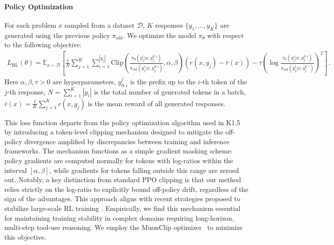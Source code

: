 \paragraph{Policy Optimization}
For each problem $x$ sampled from a dataset $\mathcal{D}$, $K$ responses $\{y_1,\dots,y_K\}$ are generated using the previous policy $\pi_{\mathrm{old}}$.
We optimize the model $\pi_\theta$ with respect to the following objective: 
\begin{align}
L_{\mathrm{RL}}(\theta) = \mathbb{E}_{x \sim\mathcal{D}}
\left[ \frac{1}{N} \sum_{j=1}^K \sum_{i=1}^{|y_j|}
\mathrm{Clip}
\left(
\frac{\pi_{\theta}(y_j^i | x, y_j^{0:i})}{\pi_{\mathrm{old}}(y_j^i | x, y_j^{0:i}) }, \alpha, \beta
\right)
({r}(x, y_j) - \bar{r}(x))- \tau \left( \log \frac{\pi_{\theta}(y_j^i | x, y_j^{0:i})}{\pi_{\mathrm{old}}(y_j^i | x, y_j^{0:i}) } \right)^2
\right]
\, .
\label{eq:rl-objective}
\end{align}
Here $\alpha, \beta, \tau >0$ are hyperparameters, 
$y^j_{0:i}$ is the prefix up to the $i$-th token of the $j$-th response, 
$N=\sum_{i=1}^{K} |y_i|$ is the total number of generated tokens in a batch, 
$\bar{r}(x) = \frac{1}{K}\sum_{j=1}^K r(x, y_j)$ is the mean reward of all generated responses.   

This loss function departs from the policy optimization algorithm used in K1.5~\citep{team2025kimi} by introducing a token-level clipping mechanism designed to mitigate the off-policy divergence amplified by discrepancies between training and inference frameworks. 
The mechanism functions as a simple gradient masking scheme: policy gradients are computed normally for tokens with log-ratios within the interval $[\alpha, \beta]$, while gradients for tokens falling outside this range are zeroed out. 
Notably, a key distinction from standard PPO clipping \citep{schulman2017proximal} is that our method relies strictly on the log-ratio to explicitly bound off-policy drift, regardless of the sign of the advantages. 
This approach aligns with recent strategies proposed to stabilize large-scale RL training \citep{yao2025offpolicy, IcePop2025}. 
Empirically, we find this mechanism essential for maintaining training stability in complex domains requiring long-horizon, multi-step tool-use reasoning.
We employ the MuonClip optimizer~\citep{jordan2024muon,liu2025muon} to minimize this objective. 


